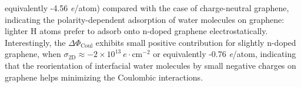 equivalently -4.56 \textit{e}/atom) compared with the case of
charge-neutral graphene, indicating the polarity-dependent adsorption
of water molecules on graphene: lighter H atoms prefer to adsorb onto
n-doped graphene electrostatically.
%
Interestingly, the
\(\Delta \Phi_{\mathrm{Coul}}\) exhibits small positive contribution
for slightly n-doped graphene, when
\(\sigma_{\mathrm{2D}} \approx -2\times10^{13}\ e\cdot
\mathrm{cm}^{-2}\) or equivalently -0.76 \textit{e}/atom, indicating
that the reorientation of interfacial water molecules by small
negative charges on graphene helps minimizing the Coulombic
interactions.

